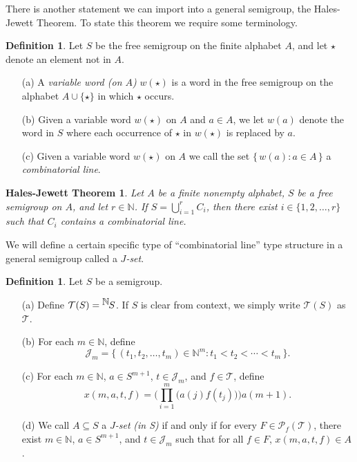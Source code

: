 \documentclass[12pt]{article}
\theoremstyle{plain}
\newtheorem*{hj}{Hales-Jewett Theorem}
\theoremstyle{definition}
\newtheorem{defn}[thm]{Definition}
\newcommand{\bbN}{\mathbb{N}}
\newcommand{\calJ}{\mathcal{J}}
\newcommand{\calT}{\mathcal{T}}
\newcommand{\Pf}{\mathcal{P}_f}
\newcommand{\setfunc}[2]{\hbox{${}^{\hbox{$#1$}}\hskip -1 pt #2$}}
\begin{document}
There is another statement we can import into a general semigroup, the
Hales-Jewett Theorem.
To state this theorem we require some terminology. 

\begin{defn}
  Let $S$ be the free semigroup on the finite alphabet $A$, and let
  $\star$ denote an element not in $A$.
  \begin{itemize}
    \item[(a)] A \textsl{variable word (on $A$)} $w(\star)$ is a word in the
      free semigroup on the alphabet $A \cup \{\star\}$ in which
      $\star$ occurs.

    \item[(b)] Given a variable word $w(\star)$ on $A$ and $a \in A$,
      we let $w(a)$ denote the word in $S$ where each occurrence of
      $\star$ in $w(\star)$ is replaced by $a$.

    \item[(c)] Given a variable word $w(\star)$ on $A$ we call the set
      $\{\, w(a) : a \in A \,\}$ a \textsl{combinatorial line}.
  \end{itemize}
\end{defn}

\begin{hj}
  Let $A$ be a finite nonempty alphabet, $S$ be a free semigroup on
  $A$, and let $r \in \bbN$.
  If $S = \bigcup_{i=1}^r C_i$, then there exist $i \in \{1, 2,
  \ldots, r\}$ such that $C_i$ contains a combinatorial line. 
\end{hj}

We will define a certain specific type of ``combinatorial line'' type
structure in a general semigroup called a \textsl{$J$-set}.

\begin{defn}
  Let $S$ be a semigroup. 
  \begin{itemize}
    \item[(a)] Define $\calT(S) = \setfunc{\bbN}{S}$.
      If $S$ is clear from context, we simply write $\calT(S)$ as
      $\calT$.

    \item[(b)] For each $m \in \bbN$, define
      \[
        \calJ_m = \{\, (t_1, t_2, \ldots, t_m) \in \bbN^m : t_1 < t_2
        < \cdots < t_m \,\}.
      \]

    \item[(c)] For each $m \in \bbN$, $a \in S^{m+1}$, $t \in
      \calJ_m$, and $f \in \calT$, define
      \[
        x(m, a, t, f) = \biggl(\prod_{i=1}^m \bigl( a(j) f(t_j) \bigr)
        \biggr) a(m+1).
      \]

    \item[(d)] We call $A \subseteq S$ a \textsl{$J$-set}%
      \textsl{(in S)} if and only if for every $F \in \Pf(\calT)$,
      there exist $m \in \bbN$, $a \in S^{m+1}$, and $t \in \calJ_m$
      such that for all $f  \in F$, $x(m, a, t, f) \in A$. 
  \end{itemize}
\end{defn}
\end{document}
